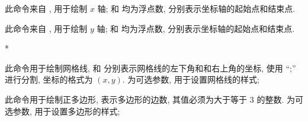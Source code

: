 \documentclass[
  hyper, lang=cn, 
  class=l3dox, 
]{../../zlatex/code/ztex}
\begin{document}
\begin{function}[added=2025-05-15]{\xAxis}
  \begin{syntax}
  \end{syntax}
  此命令来自 , 用于绘制 $x$ 轴;  和  均为浮点数, 分别表示坐标轴的起始点和结束点.
\end{function}



\begin{function}[added=2025-05-15]{\yAxis}
  \begin{syntax}
  \end{syntax}
  此命令来自 , 用于绘制 $y$ 轴;  和  均为浮点数, 分别表示坐标轴的起始点和结束点.
\end{function}
\begin{DocExample}*
\end{DocExample}



\begin{function}[added=2025-05-15]{\ShowGrid}
  \begin{syntax}
  \end{syntax}
  此命令用于绘制网格线,  和  分别表示网格线的左下角和和右上角的坐标, 使用 ``;'' 进行分割, 
  坐标的格式为 $(x, y)$.  为可选参数, 用于设置网格线的样式;
\end{function}


\begin{function}[added=2025-05-15]{\Polygon}
  \begin{syntax}
  \end{syntax}
  此命令用于绘制正多边形,  表示多边形的边数, 其值必须为大于等于 3 的整数.
   为可选参数, 用于设置多边形的样式;
\end{function}
\end{document}

